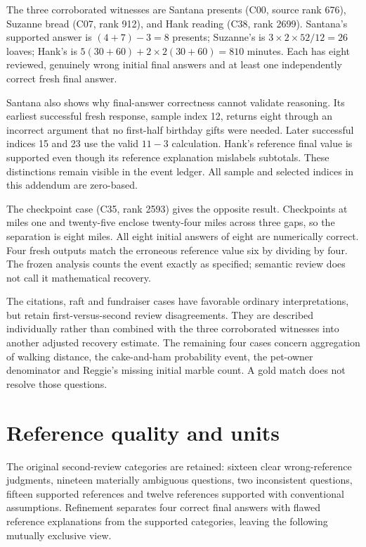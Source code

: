 \documentclass[11pt,a4paper]{article}
\begin{document}
The three corroborated witnesses are Santana presents (C00, source rank
676), Suzanne bread (C07, rank 912), and Hank reading (C38, rank 2699).
Santana's supported answer is \((4+7)-3=8\) presents; Suzanne's is
\(3\times2\times52/12=26\) loaves; Hank's is
\(5(30+60)+2\times2(30+60)=810\) minutes. Each has eight reviewed,
genuinely wrong initial final answers and at least one independently
correct fresh final answer.

Santana also shows why final-answer correctness cannot validate
reasoning. Its earliest successful fresh response, sample index 12,
returns eight through an incorrect argument that no first-half birthday
gifts were needed. Later successful indices 15 and 23 use the valid
\(11-3\) calculation. Hank's reference final value is supported even
though its reference explanation mislabels subtotals. These distinctions
remain visible in the event ledger. All sample and selected indices in
this addendum are zero-based.

The checkpoint case (C35, rank 2593) gives the opposite result.
Checkpoints at miles one and twenty-five enclose twenty-four miles
across three gaps, so the separation is eight miles. All eight initial
answers of eight are numerically correct. Four fresh outputs match the
erroneous reference value six by dividing by four. The frozen analysis
counts the event exactly as specified; semantic review does not call it
mathematical recovery.

The citations, raft and fundraiser cases have favorable ordinary
interpretations, but retain first-versus-second review disagreements.
They are described individually rather than combined with the three
corroborated witnesses into another adjusted recovery estimate. The
remaining four cases concern aggregation of walking distance, the
cake-and-ham probability event, the pet-owner denominator and Reggie's
missing initial marble count. A gold match does not resolve those
questions.

\section{Reference quality and units}\label{reference-quality-and-units}

The original second-review categories are retained: sixteen clear
wrong-reference judgments, nineteen materially ambiguous questions, two
inconsistent questions, fifteen supported references and twelve
references supported with conventional assumptions. Refinement separates
four correct final answers with flawed reference explanations from the
supported categories, leaving the following mutually exclusive view.
\end{document}
